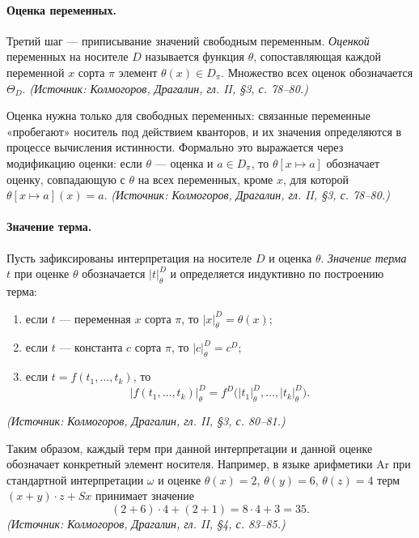 \documentclass[a4paper,12pt]{article}
\begin{document}
\paragraph{Оценка переменных.} Третий шаг --- приписывание значений свободным переменным. \emph{Оценкой} переменных на носителе \(D\) называется функция \(\theta\), сопоставляющая каждой переменной \(x\) сорта \(\pi\) элемент \(\theta(x)\in D_\pi\). Множество всех оценок обозначается \(\Theta_D\).
\textit{(Источник: Колмогоров, Драгалин, гл. II, §3, с. 78--80.)}

Оценка нужна только для свободных переменных: связанные переменные «пробегают» носитель под действием кванторов, и их значения определяются в процессе вычисления истинности. Формально это выражается через модификацию оценки: если \(\theta\) --- оценка и \(a\in D_\pi\), то \(\theta[x\mapsto a]\) обозначает оценку, совпадающую с \(\theta\) на всех переменных, кроме \(x\), для которой \(\theta[x\mapsto a](x)=a\).
\textit{(Источник: Колмогоров, Драгалин, гл. II, §3, с. 78--80.)}

\paragraph{Значение терма.} Пусть зафиксированы интерпретация на носителе \(D\) и оценка \(\theta\). \emph{Значение терма} \(t\) при оценке \(\theta\) обозначается \(|t|^D_\theta\) и определяется индуктивно по построению терма:
\begin{enumerate}[label=\arabic*)]
\item если \(t\) --- переменная \(x\) сорта \(\pi\), то \(|x|^D_\theta=\theta(x)\);
\item если \(t\) --- константа \(c\) сорта \(\pi\), то \(|c|^D_\theta=c^D\);
\item если \(t=f(t_1,\ldots,t_k)\), то
\[
|f(t_1,\ldots,t_k)|^D_\theta=f^D\bigl(|t_1|^D_\theta,\ldots,|t_k|^D_\theta\bigr).
\]
\end{enumerate}
\textit{(Источник: Колмогоров, Драгалин, гл. II, §3, с. 80--81.)}

Таким образом, каждый терм при данной интерпретации и данной оценке обозначает конкретный элемент носителя. Например, в языке арифметики \(\mathrm{Ar}\) при стандартной интерпретации \(\omega\) и оценке \(\theta(x)=2\), \(\theta(y)=6\), \(\theta(z)=4\) терм \((x+y)\cdot z+Sx\) принимает значение
\[
(2+6)\cdot 4+(2+1)=8\cdot 4+3=35.
\]
\textit{(Источник: Колмогоров, Драгалин, гл. II, §4, с. 83--85.)}
\end{document}
